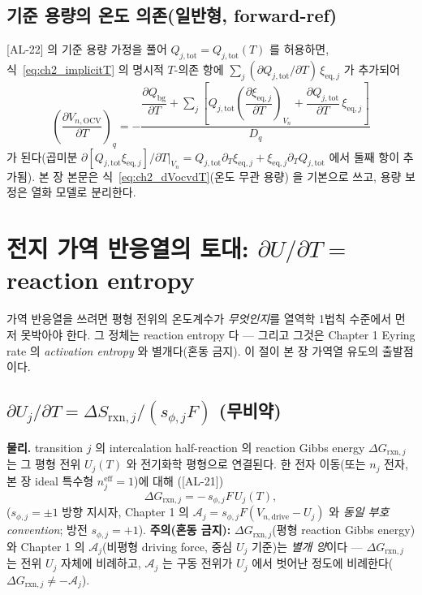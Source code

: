 \documentclass[11pt,a4paper]{article}
\newcommand{\eff}{\mathrm{eff}}
\newcommand{\eq}{\mathrm{eq}}
\newcommand{\drive}{\mathrm{drive}}
\newcommand{\bg}{\mathrm{bg}}
\newcommand{\OCV}{\mathrm{OCV}}
\newcommand{\tot}{\mathrm{tot}}
\newcommand{\rxn}{\mathrm{rxn}}
\newcommand{\AL}[1]{\textsf{[AL-#1]}}
\begin{document}
\subsection{기준 용량의 온도 의존(일반형, forward-ref)}\label{sec:ch2_ocvT_general}
\AL{22} 의 기준 용량 가정을 풀어 $Q_{j,\tot}=Q_{j,\tot}(T)$ 를 허용하면, 식~\eqref{eq:ch2_implicitT} 의 명시적
$T$-의존 항에 $\sum_j(\partial Q_{j,\tot}/\partial T)\,\xi_{\eq,j}$ 가 추가되어
\begin{equation}
\left(\frac{\partial V_{n,\OCV}}{\partial T}\right)_q
=-\frac{\dfrac{\partial Q_\bg}{\partial T}+\displaystyle\sum_j\!\left[Q_{j,\tot}\!\left(\dfrac{\partial\xi_{\eq,j}}{\partial T}\right)_{V_n}\!\!+\dfrac{\partial Q_{j,\tot}}{\partial T}\,\xi_{\eq,j}\right]}{D_q}
\label{eq:ch2_dVocvdT_gen}
\end{equation}
가 된다(곱미분 $\partial[Q_{j,\tot}\xi_{\eq,j}]/\partial T|_{V_n}=Q_{j,\tot}\partial_T\xi_{\eq,j}+\xi_{\eq,j}\partial_T Q_{j,\tot}$
에서 둘째 항이 추가됨). 본 장 본문은 식~\eqref{eq:ch2_dVocvdT}(온도 무관 용량) 을 기본으로 쓰고, 용량 보정은
열화 모델로 분리한다.

\section{전지 가역 반응열의 토대: $\partial U/\partial T=$ reaction entropy}\label{sec:ch2_entropy}
가역 반응열을 쓰려면 평형 전위의 온도계수가 \emph{무엇인지}를 열역학 1법칙 수준에서 먼저 못박아야 한다. 그
정체는 reaction entropy 다 — 그리고 그것은 Chapter 1 Eyring rate 의 \emph{activation entropy} 와 별개다(혼동
금지). 이 절이 본 장 가역열 유도의 출발점이다.

\subsection{$\partial U_j/\partial T=\Delta S_{\rxn,j}/(s_{\phi,j}F)$ (무비약)}\label{sec:ch2_dUdT}
\textbf{물리.} transition $j$ 의 intercalation half-reaction 의 reaction Gibbs energy $\Delta G_{\rxn,j}$ 는
그 평형 전위 $U_j(T)$ 와 전기화학 평형으로 연결된다. 한 전자 이동(또는 $n_j$ 전자, 본 장 ideal 특수형
$n_j^{\eff}=1$)에 대해 \cite{bardfaulkner,newman}(\AL{21})
\begin{equation}
\Delta G_{\rxn,j}=-\,s_{\phi,j}F\,U_j(T),
\label{eq:ch2_dGrxn}
\end{equation}
($s_{\phi,j}=\pm1$ 방향 지시자, Chapter 1 의 $\mathcal A_j=s_{\phi,j}F(V_{n,\drive}-U_j)$ 와 \emph{동일 부호
convention}; 방전 $s_{\phi,j}=+1$). \textbf{주의(혼동 금지):} $\Delta G_{\rxn,j}$(평형 reaction Gibbs energy)
와 Chapter 1 의 $\mathcal A_j$(비평형 driving force, 중심 $U_j$ 기준)는 \emph{별개 양}이다 — $\Delta G_{\rxn,j}$
는 전위 $U_j$ 자체에 비례하고, $\mathcal A_j$ 는 구동 전위가 $U_j$ 에서 벗어난 정도에 비례한다($\Delta G_{\rxn,j}\ne-\mathcal A_j$).
\end{document}
